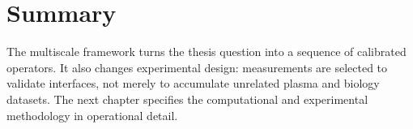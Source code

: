\section{Summary}

The multiscale framework turns the thesis question into a sequence of calibrated operators. It also changes experimental design: measurements are selected to validate interfaces, not merely to accumulate unrelated plasma and biology datasets. The next chapter specifies the computational and experimental methodology in operational detail.

